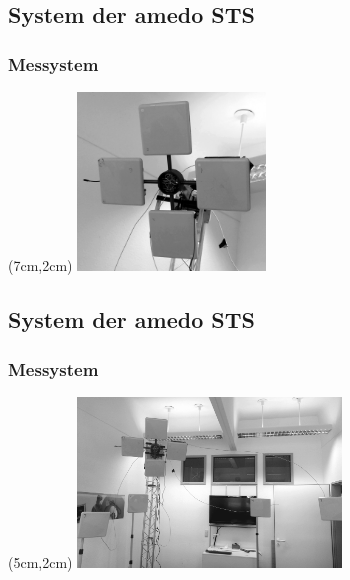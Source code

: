 \subsection{System der amedo STS}
\begin{frame}
  \frametitle{Messystem}
	\begin{textblock*}{5cm}(7cm,2cm) %
  		\includegraphics[width=5cm]{../img/4AntennaSetup_small.png}
  	\end{textblock*}
\end{frame}
\subsection{System der amedo STS}
\begin{frame}
  \frametitle{Messystem}
	\begin{textblock*}{7cm}(5cm,2cm) %
  		\includegraphics[width=7cm]{../img/RFID-Okto.png}
  	\end{textblock*}
\end{frame}
